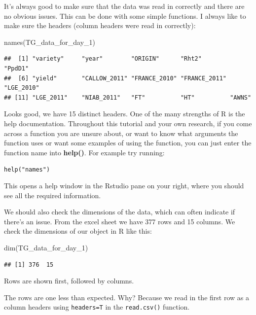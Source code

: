 \documentclass[
]{book}
\makeatletter
\newenvironment{Shaded}{\begin{snugshade}}{\end{snugshade}}
\newcommand{\FunctionTok}[1]{\textcolor[rgb]{0.00,0.00,0.00}{#1}}
\newcommand{\NormalTok}[1]{#1}
\newenvironment{kframe}{%
\medskip{}
\setlength{\fboxsep}{.8em}
 \def\at@end@of@kframe{}%
 \ifinner\ifhmode%
  \def\at@end@of@kframe{\end{minipage}}%
  \begin{minipage}{\columnwidth}%
 \fi\fi%
 \def\FrameCommand##1{\hskip\@totalleftmargin \hskip-\fboxsep
 \colorbox{shadecolor}{##1}\hskip-\fboxsep
     \hskip-\linewidth \hskip-\@totalleftmargin \hskip\columnwidth}%
 \MakeFramed {\advance\hsize-\width
   \@totalleftmargin\z@ \linewidth\hsize
   \@setminipage}}%
 {\par\unskip\endMakeFramed%
 \at@end@of@kframe}
\newenvironment{rmdblock}[1]
  {
  \begin{itemize}
  \renewcommand{\labelitemi}{
    \raisebox{-.7\height}[0pt][0pt]{
      {\setkeys{Gin}{width=3em,keepaspectratio}\texttt{[image: images/\#1]}}
    }
  }
  \setlength{\fboxsep}{1em}
  \begin{kframe}
  \item
  }
  {
  \end{kframe}
  \end{itemize}
  }
\newenvironment{rmdcaution}
  {\begin{rmdblock}{caution}}
  {\end{rmdblock}}
\makeatother
\begin{document}
It's always good to make sure that the data was read in correctly and there are no obvious issues. This can be done with some simple functions. I always like to make sure the headers (column headers were read in correctly):

\begin{Shaded}
\begin{Highlighting}[]
\FunctionTok{names}\NormalTok{(TG\_data\_for\_day\_1)}
\end{Highlighting}
\end{Shaded}

\begin{verbatim}
##  [1] "variety"     "year"        "ORIGIN"      "Rht2"        "PpdD1"      
##  [6] "yield"       "CALLOW_2011" "FRANCE_2010" "FRANCE_2011" "LGE_2010"   
## [11] "LGE_2011"    "NIAB_2011"   "FT"          "HT"          "AWNS"
\end{verbatim}

Looks good, we have 15 distinct headers. One of the many strengths of R is the help documentation. Throughout this tutorial and your own research, if you come across a function you are unsure about, or want to know what arguments the function uses or want some examples of using the function, you can just enter the function name into \textbf{help()}. For example try running:

\texttt{help("names")}

This opens a help window in the Rstudio pane on your right, where you should see all the required information.

We should also check the dimensions of the data, which can often indicate if there's an issue. From the excel sheet we have 377 rows and 15 columns. We check the dimensions of our object in R like this:

\begin{Shaded}
\begin{Highlighting}[]
\FunctionTok{dim}\NormalTok{(TG\_data\_for\_day\_1)}
\end{Highlighting}
\end{Shaded}

\begin{verbatim}
## [1] 376  15
\end{verbatim}

Rows are shown first, followed by columns.

\begin{rmdcaution}
The rows are one less than expected. Why? Because we read in the first row as a column headers using \texttt{headers=T} in the \texttt{read.csv()} function.
\end{rmdcaution}
\end{document}
